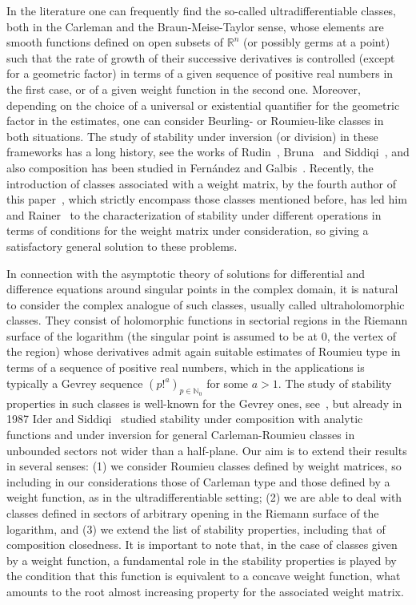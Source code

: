 \documentclass[11pt,a4paper]{article}
\theoremstyle{plain}
\theoremstyle{definition}
\newcommand{\RR}{\mathbb{R}}
\newcommand{\NN}{\mathbb{N}}
\begin{document}
In the literature one can frequently find the so-called ultradifferentiable classes, both in the Carleman and the Braun-Meise-Taylor sense, whose elements are smooth functions defined on open subsets of $\RR^n$ (or possibly germs at a point) such that the rate of growth of their successive derivatives is controlled (except for a geometric factor) in terms of a given sequence of positive real numbers in the first case, or of a given weight function in the second one. Moreover, depending on the choice of a universal or existential quantifier for the geometric factor in the estimates, one can consider Beurling- or Roumieu-like classes in both situations. The study of stability under inversion (or division) in these frameworks has a long history, see the works of Rudin~\cite{RudinDivision}, Bruna~\cite{BrunaInverse} and Siddiqi~\cite{Siddiqi}, and also composition has been studied in Fern\'andez and Galbis~\cite{FernandezGalbis06}. Recently, the introduction of classes associated with a weight matrix, by the fourth author of this paper~\cite{diploma,dissertation}, which strictly encompass those classes mentioned before, has led him and Rainer~\cite{compositionpaper,characterizationstabilitypaper}
to the characterization of stability under different operations in terms of conditions for the weight matrix under consideration, so giving a satisfactory general solution to these problems.

In connection with the asymptotic theory of solutions for differential and difference equations around singular points in the complex domain, it is natural to consider the complex analogue of such classes, usually called ultraholomorphic classes. They consist of holomorphic functions in sectorial regions in the Riemann surface of the logarithm (the singular point is assumed to be at 0, the vertex of the region) whose derivatives admit again suitable estimates of Roumieu type in terms of a sequence of positive real numbers, which in the applications is typically a Gevrey sequence $(p!^{a})_{p\in\NN_0}$ for some $a>1$. The study of stability properties in such classes is well-known for the Gevrey ones, see~\cite{BalserUTX}, but already in 1987 Ider and Siddiqi~\cite{IderSiddiqi} studied stability under composition with analytic functions and under inversion for general Carleman-Roumieu classes in unbounded sectors not wider than a half-plane. Our aim is to extend their results in several senses: (1) we consider Roumieu classes defined by weight matrices, so including in our considerations those of Carleman type and those defined by a weight function, as in the ultradifferentiable setting; (2) we are able to deal with classes defined in sectors of arbitrary opening in the Riemann surface of the logarithm, and (3) we extend the list of stability properties, including that of composition closedness.
It is important to note that, in the case of classes given by a weight function, a fundamental role in the stability properties is played by the condition that this function is equivalent to a concave weight function, what amounts to the root almost increasing property for the associated weight matrix.
\end{document}

